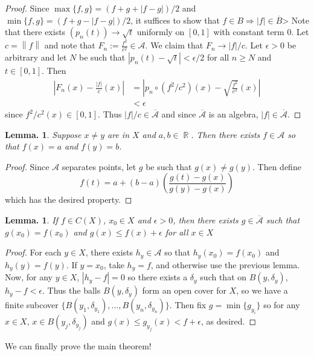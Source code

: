 \documentclass[11pt, a4paper]{memoir}
\DeclareMathOperator{\R}{{\mathbb{R}}}
\newcommand{\norm}[1]{\ensuremath{\left\lVert#1\right\rVert}}
\theoremstyle{change}
\newtheorem{lemma}[theorem]{Lemma.}
\theoremstyle{plain}
\theoremstyle{nonumberplain}
\newtheorem{proof}{Proof}
\numberwithin{equation}{section}
\begin{document}
\begin{proof}
    Since $\max\{f,g\}=(f+g+|f-g|)/2$ and $\min\{f,g\}=(f+g-|f-g|)/2$, it suffices to show that $f\in B\Rightarrow |f|\in\overline{B}$>
    Note that there exists $(p_n(t))\to\sqrt{t}$ uniformly on $[0,1]$ with constant term $0$.
    Let $c=\norm{f}$ and note that $F_n:=\frac{f^2}{c^2}\in\mathcal{A}$.
    We claim that $F_n\to |f|/c$.
    Let $\epsilon>0$ be arbitrary and let $N$ be such that $|p_n(t)-\sqrt{t}|<\epsilon/2$ for all $n\geq N$ and $t\in[0,1]$.
    Then
    \begin{align*}
        \left\lvert F_n(x)-\frac{|f|}{c}(x)\right\rvert &= \left\lvert p_n\circ (f^2/c^2)(x)-\sqrt{\frac{f^2}{c^2}}(x)\right\rvert\\
                                                        &<\epsilon
    \end{align*}
    since $f^2/c^2(x)\in[0,1]$.
    Thus $|f|/c\in\overline{\mathcal{A}}$ and since $\overline{\mathcal{A}}$ is an algebra, $|f|\in\overline{\mathcal{A}}$.
\end{proof}
\begin{lemma}
    Suppose $x\neq y$ are in $X$ and $a,b\in\R$.
    Then there exists $f\in\mathcal{A}$ so that $f(x)=a$ and $f(y)=b$.
\end{lemma}
\begin{proof}
    Since $\mathcal{A}$ separates points, let $g$ be such that $g(x)\neq g(y)$.
    Then define
    \[f(t)=a+(b-a)\left(\frac{g(t)-g(x)}{g(y)-g(x)}\right)\]
    which has the desired property.
\end{proof}
\begin{lemma}
    If $f\in C(X)$, $x_0\in X$ and $\epsilon>0$, then there exists $g\in\overline{\mathcal{A}}$ such that $g(x_0)=f(x_0)$ and $g(x)\leq f(x)+\epsilon$ for all $x\in X$
\end{lemma}
\begin{proof}
    For each $y\in X$, there exists $h_y\in \mathcal{A}$ so that $h_y(x_0)=f(x_0)$ and $h_y(y)=f(y)$.
    If $y=x_0$, take $h_y=f$, and otherwise use the previous lemma.
    Now, for any $y\in X$, $|h_y-f|=0$ so there exists a $\delta_y$ such that on $B(y,\delta_y)$, $h_y-f<\epsilon$.
    Thus the balls $B(y,\delta_y)$ form an open cover for $X$, so we have a finite subcover $\{B(y_1,\delta_{y_1}),\ldots,B(y_n,\delta_{y_n})\}$.
    Then fix $g=\min\{g_{y_i}\}$ so for any $x\in X$, $x\in B(y_j,\delta_{y_j})$ and $g(x)\leq g_{y_j}(x)<f+\epsilon$, as desired.
\end{proof}
We can finally prove the main theorem!
\end{document}

